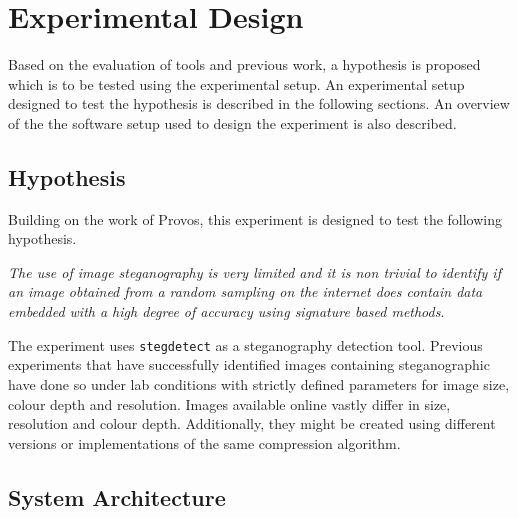 \chapter{Experimental Design}
\label{ch:dev}
Based on the evaluation of tools and previous work, a hypothesis is proposed which is to be tested using the experimental setup. An experimental setup designed to test the hypothesis is described in the following sections. An overview of the the software setup used to design the experiment is also described.
\section{Hypothesis}
Building on the work of Provos, this experiment is designed to test the following hypothesis. 
\par
\emph{The use of image steganography is very limited and it is non trivial to identify if an image obtained from a random sampling on the internet does contain data embedded with a high degree of accuracy using signature based methods}. 
\par The experiment uses \texttt{stegdetect} as a steganography detection tool. Previous experiments that have successfully identified images containing steganographic have done so under lab conditions with strictly defined parameters for image size, colour depth and resolution. Images available online vastly differ in size, resolution and colour depth. Additionally, they might be created using different versions or implementations of the same compression algorithm. 
\section{System Architecture}
\label{sec:sysarch}



